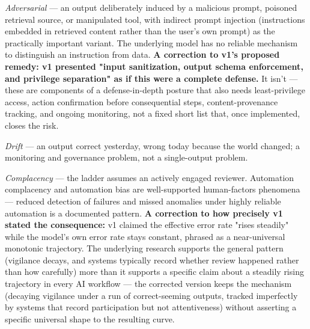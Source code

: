 \emph{Adversarial} --- an output deliberately induced by a malicious prompt, poisoned retrieval source, or manipulated tool, with indirect prompt injection (instructions embedded in retrieved content rather than the user's own prompt) as the practically important variant. The underlying model has no reliable mechanism to distinguish an instruction from data. \textbf{A correction to v1's proposed remedy: v1 presented "input sanitization, output schema enforcement, and privilege separation" as if this were a complete defense.} It isn't --- these are components of a defense-in-depth posture that also needs least-privilege access, action confirmation before consequential steps, content-provenance tracking, and ongoing monitoring, not a fixed short list that, once implemented, closes the risk.

\emph{Drift} --- an output correct yesterday, wrong today because the world changed; a monitoring and governance problem, not a single-output problem.

\emph{Complacency} --- the ladder assumes an actively engaged reviewer. Automation complacency and automation bias are well-supported human-factors phenomena --- reduced detection of failures and missed anomalies under highly reliable automation is a documented pattern. \textbf{A correction to how precisely v1 stated the consequence:} v1 claimed the effective error rate "rises steadily" while the model's own error rate stays constant, phrased as a near-universal monotonic trajectory. The underlying research supports the general pattern (vigilance decays, and systems typically record whether review happened rather than how carefully) more than it supports a specific claim about a steadily rising trajectory in every AI workflow --- the corrected version keeps the mechanism (decaying vigilance under a run of correct-seeming outputs, tracked imperfectly by systems that record participation but not attentiveness) without asserting a specific universal shape to the resulting curve.
